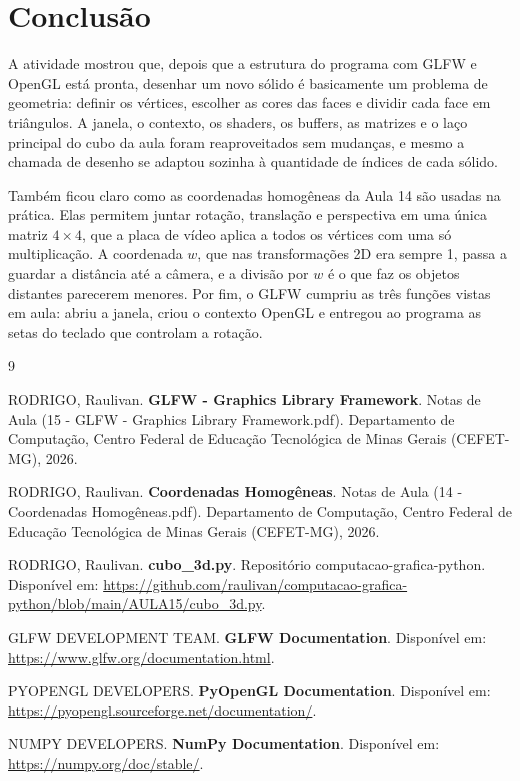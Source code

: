 \documentclass{article}
\begin{document}
\section{Conclusão}

A atividade mostrou que, depois que a estrutura do programa com GLFW e OpenGL está pronta, desenhar um novo sólido é basicamente um problema de geometria: definir os vértices, escolher as cores das faces e dividir cada face em triângulos. A janela, o contexto, os shaders, os buffers, as matrizes e o laço principal do cubo da aula foram reaproveitados sem mudanças, e mesmo a chamada de desenho se adaptou sozinha à quantidade de índices de cada sólido.

Também ficou claro como as coordenadas homogêneas da Aula 14 são usadas na prática. Elas permitem juntar rotação, translação e perspectiva em uma única matriz $4\times4$, que a placa de vídeo aplica a todos os vértices com uma só multiplicação. A coordenada $w$, que nas transformações 2D era sempre 1, passa a guardar a distância até a câmera, e a divisão por $w$ é o que faz os objetos distantes parecerem menores. Por fim, o GLFW cumpriu as três funções vistas em aula: abriu a janela, criou o contexto OpenGL e entregou ao programa as setas do teclado que controlam a rotação.

\begin{thebibliography}{9}

RODRIGO, Raulivan. \textbf{GLFW - Graphics Library Framework}. Notas de Aula (15 - GLFW - Graphics Library Framework.pdf). Departamento de Computação, Centro Federal de Educação Tecnológica de Minas Gerais (CEFET-MG), 2026.

RODRIGO, Raulivan. \textbf{Coordenadas Homogêneas}. Notas de Aula (14 - Coordenadas Homogêneas.pdf). Departamento de Computação, Centro Federal de Educação Tecnológica de Minas Gerais (CEFET-MG), 2026.

RODRIGO, Raulivan. \textbf{cubo\_3d.py}. Repositório computacao-grafica-python. Disponível em: \url{https://github.com/raulivan/computacao-grafica-python/blob/main/AULA15/cubo_3d.py}.

GLFW DEVELOPMENT TEAM. \textbf{GLFW Documentation}. Disponível em: \url{https://www.glfw.org/documentation.html}.

PYOPENGL DEVELOPERS. \textbf{PyOpenGL Documentation}. Disponível em: \url{https://pyopengl.sourceforge.net/documentation/}.

NUMPY DEVELOPERS. \textbf{NumPy Documentation}. Disponível em: \url{https://numpy.org/doc/stable/}.

\end{thebibliography}
\end{document}
